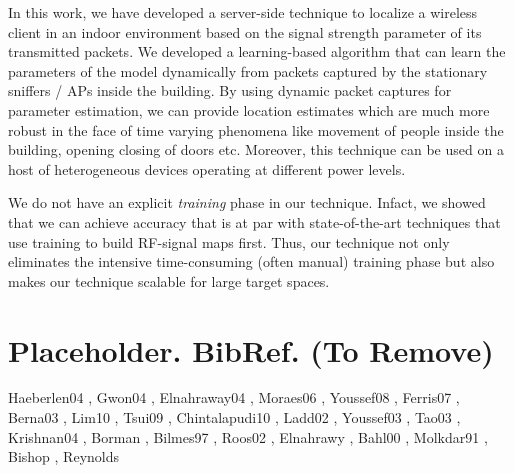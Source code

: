 \documentclass{Localization-PaperWriteupDraft}
\begin{document}
In this work, we have developed a server-side technique to localize a
wireless client in an indoor environment based on the signal strength
parameter of its transmitted packets. We developed a learning-based
algorithm that can learn the parameters of the model
dynamically from packets captured by the stationary sniffers / APs
inside the building. By using dynamic packet captures for parameter
estimation, we can provide location estimates which are much more robust in the face of time
varying phenomena like movement of people inside the building, opening
closing of doors etc. Moreover, this technique can be used on a host of
heterogeneous devices operating at different power levels. 

We do not have an explicit {\it training} phase in our technique.
Infact, we showed that we can achieve accuracy that is at par with state-of-the-art
techniques that use training to build RF-signal maps first. Thus,
our technique not only eliminates the intensive time-consuming (often manual) training phase
but also makes our technique scalable for large target spaces.

\section{Placeholder. BibRef. (To Remove)}
Haeberlen04 \cite{Haeberlen:2004:PRL:1023720.1023728},
Gwon04 \cite{Gwon:2004:ECC:1023783.1023786},
Elnahraway04 \cite{Elnahraway:2004:LLU:1031495.1031537},
Moraes06 \cite{Moraes:2006:CWL:1164783.1164799},
Youssef08 \cite{Youssef:2008:HLD:1399551.1399558},
Ferris07 \cite{Ferris:2007:WUG:1625275.1625675},
Berna03 \cite{Berna:2003:LAL:1630659.1630885},
Lim10 \cite{Lim:2010:ZIL:1741400.1741464},
Tsui09 \cite{Tsui:2009:ULS:1741410.1741596},
Chintalapudi10 \cite{Chintalapudi:2010:ILW:1859995.1860016},
Ladd02 \cite{Ladd:2002:RLS:570645.570674},
Youssef03 \cite{Youssef:2003:WLD:826025.826335},
Tao03 \cite{Tao:2003:WLL:941311.941314},
Krishnan04 \cite{Krishnan04asystem},
Borman \cite{Borman_theexpectation},
Bilmes97 \cite{Bilmes97agentle},
Roos02 \cite{Roos},
Elnahrawy \cite{Elnahrawy05bayesianindoor},
Bahl00 \cite{Bahl00radar:an},
Molkdar91 \cite{Molkdar},
Bishop \cite{Bishop:2006:PRM:1162264},
Reynolds \cite{Reynolds}


%
%
\end{document}
